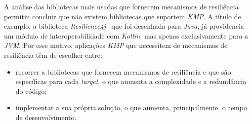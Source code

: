 A análise das bibliotecas mais usadas que fornecem mecanismos de resiliência permitiu concluir que não existem bibliotecas que suportem \textit{KMP}.
A título de exemplo, a biblioteca \textit{Resilience4j}~\cite{resilience4j} que foi desenhada para \textit{Java}, já providencia um módulo de interoperabilidade com \textit{Kotlin}, mas apenas exclusivamente para a \textit{JVM}.
Por esse motivo, aplicações \textit{KMP} que necessitem de mecanismos de resiliência têm de escolher entre:

\begin{itemize}[topsep=0pt,itemsep=0pt,partopsep=0pt, parsep=0pt]
    \item recorrer a bibliotecas que fornecem mecanismos de resiliência e que são específicas para cada \textit{target}, o que aumenta a complexidade e a redundância do código;
    \item implementar a sua própria solução, o que aumenta, principalmente, o tempo de desenvolvimento.
\end{itemize}

